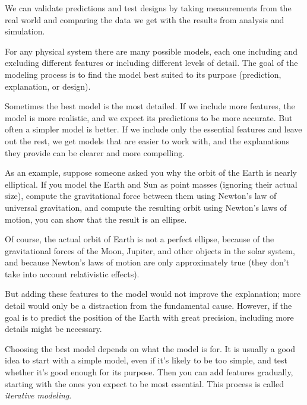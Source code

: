
We can validate predictions and test designs by taking measurements from the real world and comparing the data we get with the results from analysis and simulation.


For any physical system there are many possible models, each one including and excluding different features or including different levels of detail.  The goal of the modeling process is to find the model best suited to its purpose (prediction, explanation, or design).


Sometimes the best model is the most detailed.  If we include more features, the model is more realistic, and we expect its predictions to be more accurate. 
But often a simpler model is better.  If we include only the essential features and leave out the rest, we get models that are easier to work with, and the explanations they provide can be clearer and more compelling. 

As an example, suppose someone asked you why the orbit of the Earth is nearly elliptical.  If you model the Earth and Sun as point masses (ignoring their actual size), compute the gravitational force between them using Newton's law of universal gravitation, and compute the resulting orbit  using Newton's laws of motion, you can show that the result is an ellipse.

Of course, the actual orbit of Earth is not a perfect ellipse, because of the gravitational forces of the Moon, Jupiter, and other objects in the solar system, and because Newton's laws of motion are only approximately true (they don't take into account relativistic effects).
%
%

But adding these features to the model would not improve the explanation; more detail would only be a distraction from the fundamental cause.  However, if the goal is to predict the position of the Earth with great precision, including more details might be necessary.

Choosing the best model depends on what the model is for.  It is usually a good idea to start with a simple model, even if it's likely to be too simple, and test whether it's good enough for its purpose.  Then you can add features gradually, starting with the ones you expect to be most essential.  This process is called \emph{iterative modeling}.

